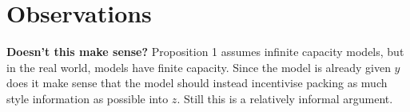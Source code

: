 \documentclass[11pt, a4paper]{article}
\begin{document}
\section{Observations}

\textbf{Doesn't this make sense?} Proposition 1 assumes infinite capacity models, but in the real world, models have finite capacity. Since the model is already given $y$ does it make sense that the model should instead incentivise packing as much style information as possible into $z$. Still this is a relatively informal argument.
\end{document}
